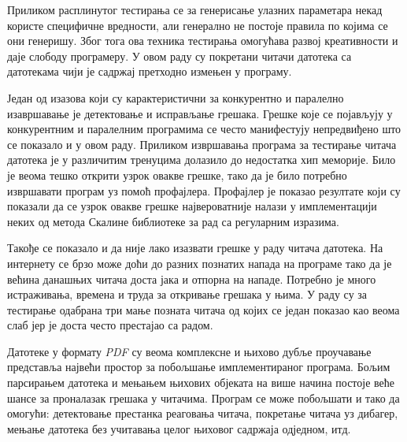 \documentclass[12pt,oneside]{memoir}
\begin{document}
Приликом расплинутог тестирања се за генерисање улазних параметара некад користе специфичне вредности, али генерално не постоје правила по којима се они генеришу. Због тога ова техника тестирања омогућава развој креативности и даје слободу програмеру. У овом раду су покретани читачи датотека са датотекама чији је садржај претходно измењен у програму. 

Један од изазова који су карактеристични за конкурентно и паралелно изавршавање је детектовање и исправљање грешака. Грешке које се појављују у конкурентним и паралелним програмима се често манифестују непредвиђено што се показало и у овом раду. Приликом извршавања програма за тестирање читача датотека је у различитим тренуцима долазило до недостатка хип меморије. Било је веома тешко открити узрок овакве грешке, тако да је било потребно извршавати програм уз помоћ профајлера. Профајлер је показао резултате који су показали да се узрок овакве грешке највероватније налази у имплементацији неких од метода Скалине библиотеке за рад са регуларним изразима.

Такође се показало и да није лако изазвати грешке у раду читача датотека. На интернету се брзо може доћи до разних познатих напада на програме тако да је већина данашњих читача доста јака и отпорна на нападе. Потребно је много истраживања, времена и труда за откривање грешака у њима. У раду су за тестирање одабрана три мање позната читача од којих се један показао као веома слаб јер је доста често престајао са радом. 

Датотеке у формату \textit{PDF} су веома комплексне и њихово дубље проучавање представља највећи простор за побољшање имплементираног програма. Бољим парсирањем датотека и мењањем њихових објеката на више начина постоје веће шансе за проналазак грешака у читачима. Програм се може побољшати и тако да омогући: детектовање престанка реаговања читача, покретање читача уз дибагер, мењање датотека без учитавања целог њиховог садржаја одједном, итд. 


\literatura

\backmatter
\end{document}
